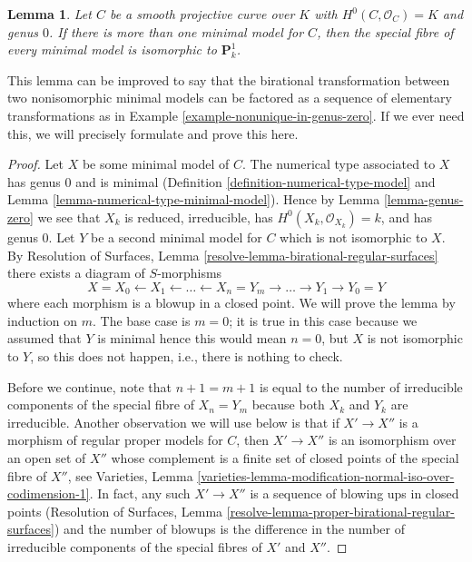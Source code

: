 \documentclass{stacks-project}
\theoremstyle{plain}
\newtheorem{lemma}[subsection]{Lemma}
\theoremstyle{definition}
\theoremstyle{remark}
\numberwithin{equation}{subsection}
\begin{document}
\begin{lemma}
\label{lemma-nonuniqueness}
Let $C$ be a smooth projective curve over $K$ with $H^0(C, \mathcal{O}_C) = K$
and genus $0$. If there is more than one minimal model for $C$, then
the special fibre of every minimal model is isomorphic to $\mathbf{P}^1_k$.
\end{lemma}

\noindent
This lemma can be improved to say that the birational transformation
between two nonisomorphic minimal models can be factored as a sequence of
elementary transformations as in Example \ref{example-nonunique-in-genus-zero}.
If we ever need this, we will precisely formulate and prove this here.

\begin{proof}
Let $X$ be some minimal model of $C$. The numerical type associated to $X$
has genus $0$ and is minimal (Definition \ref{definition-numerical-type-model}
and Lemma \ref{lemma-numerical-type-minimal-model}).
Hence by Lemma \ref{lemma-genus-zero} we see that
$X_k$ is reduced, irreducible, has $H^0(X_k, \mathcal{O}_{X_k}) = k$,
and has genus $0$. Let $Y$ be a second minimal model for $C$
which is not isomorphic to $X$. By
Resolution of Surfaces, Lemma \ref{resolve-lemma-birational-regular-surfaces}
there exists a diagram of $S$-morphisms
$$
X = X_0 \leftarrow X_1 \leftarrow \ldots \leftarrow X_n = Y_m
\to \ldots \to Y_1 \to Y_0 = Y
$$
where each morphism is a blowup in a closed point. We will prove the
lemma by induction on $m$. The base case is $m = 0$; it is
true in this case because we assumed that $Y$ is minimal
hence this would mean $n = 0$, but $X$ is not isomorphic
to $Y$, so this does not happen, i.e., there is nothing to check.

\medskip\noindent
Before we continue, note that $n + 1 = m + 1$ is equal to the number of
irreducible components of the special fibre of $X_n = Y_m$ because
both $X_k$ and $Y_k$ are irreducible. Another observation we
will use below is that if $X' \to X''$ is a morphism
of regular proper models for $C$, then $X' \to X''$ is an isomorphism
over an open set of $X''$ whose complement is a finite set
of closed points of the special fibre of $X''$, see
Varieties, Lemma
\ref{varieties-lemma-modification-normal-iso-over-codimension-1}.
In fact, any such $X' \to X''$ is a sequence
of blowing ups in closed points (Resolution of Surfaces, Lemma
\ref{resolve-lemma-proper-birational-regular-surfaces}) and the
number of blowups is the difference in the number of irreducible
components of the special fibres of $X'$ and $X''$.


\end{proof}
\end{document}
